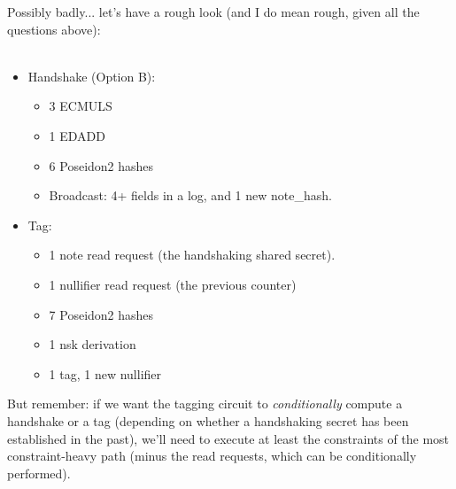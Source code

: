 Possibly badly... let's have a rough look (and I do mean rough, given all the questions above):\\
\\
\begin{itemize}
    \item Handshake (Option B):
    \begin{itemize}
        \item 3 ECMULS
        \item 1 EDADD
        \item 6 Poseidon2 hashes
        \item Broadcast: 4+ fields in a log, and 1 new note\_hash.
    \end{itemize}
    \item Tag:
    \begin{itemize}
        \item 1 note read request (the handshaking shared secret).
        \item 1 nullifier read request (the previous counter)
        \item 7 Poseidon2 hashes
        \item 1 nsk derivation
        \item 1 tag, 1 new nullifier
    \end{itemize}
\end{itemize}
\noindent
But remember: if we want the tagging circuit to \textit{conditionally} compute a handshake or a tag (depending on whether a handshaking secret has been established in the past), we'll need to execute at least the constraints of the most constraint-heavy path (minus the read requests, which can be conditionally performed).\\
\\
